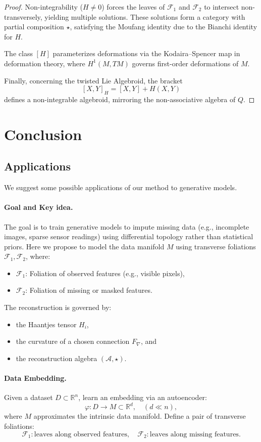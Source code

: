 \documentclass[runningheads]{llncs}
\begin{document}
\begin{proof}
Non-integrability (\( H \neq 0 \)) forces the leaves of \( \mathcal{F}_1 \) and \( \mathcal{F}_2 \) to intersect non-transversely, yielding multiple solutions. These solutions form a category with partial composition \( \star \), satisfying the Moufang identity due to the Bianchi identity for \( H \).

The class \( [H] \) parameterizes deformations via the Kodaira--Spencer map in deformation theory, where \( H^1(M, TM) \) governs first-order deformations of \( M \).

Finally, concerning the twisted Lie Algebroid, the bracket
\[
[X, Y]_H = [X, Y] + H(X, Y)
\]
defines a non-integrable algebroid, mirroring the non-associative algebra of \( Q \).
\end{proof}
\section{Conclusion}
\subsection{Applications} We suggest some possible applications of our method to generative models. 
\paragraph{Goal and Key idea.} The goal is to train generative models to impute missing data (e.g., incomplete images, sparse sensor readings) using differential topology rather than statistical priors. Here we propose to model the data manifold $M$ using transverse foliations $\mathcal{F}_1, \mathcal{F}_2$, where:
\begin{itemize}
    \item $\mathcal{F}_1$: Foliation of observed features (e.g., visible pixels),
    \item $\mathcal{F}_2$: Foliation of missing or masked features.
\end{itemize}
The reconstruction is governed by:
\begin{itemize}
    \item the Haantjes tensor $H_i$,
    \item the curvature of a chosen connection $F_\nabla$, and
    \item the reconstruction algebra $(\mathcal{A}, \star)$.
\end{itemize}

\paragraph{Data Embedding.}
Given a dataset $D \subset \mathbb{R}^n$, learn an embedding via an autoencoder:
\[
\varphi: D \to M \subset \mathbb{R}^d, \quad (d \ll n),
\]
where $M$ approximates the intrinsic data manifold.
Define a pair of transverse foliations:
\[
\mathcal{F}_1: \text{leaves along observed features}, \quad \mathcal{F}_2: \text{leaves along missing features}.
\]
\end{document}

